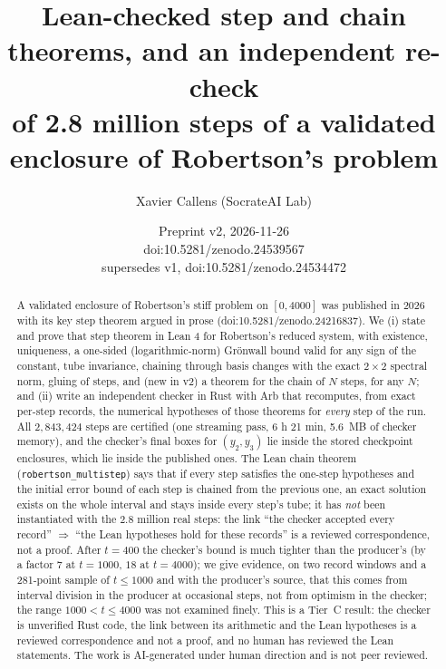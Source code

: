 \documentclass[11pt]{article}
\title{Lean-checked step and chain theorems, and an independent re-check\\
of 2.8 million steps of a validated enclosure of Robertson's problem}
\author{Xavier Callens (SocrateAI Lab)}
\date{Preprint v2, 2026-11-26 \\ doi:10.5281/zenodo.24539567 \\ supersedes v1, doi:10.5281/zenodo.24534472}
\begin{document}
\maketitle

\begin{abstract}
A validated enclosure of Robertson's stiff problem on $[0,4000]$ was published in 2026 with its key step theorem argued in prose
(doi:10.5281/zenodo.24216837). We (i) state and prove that step theorem in Lean 4 for Robertson's reduced system, with existence,
uniqueness, a one-sided (logarithmic-norm) Gr\"onwall bound valid for any sign of the constant, tube invariance, chaining through
basis changes with the exact $2\times2$ spectral norm, gluing of steps, and (new in v2) a theorem for the chain of $N$ steps, for any $N$; and (ii) write an independent checker in Rust with Arb
that recomputes, from exact per-step records, the numerical hypotheses of those theorems for \emph{every} step of the run. All
$2{,}843{,}424$ steps are certified (one streaming pass, 6 h 21 min, 5.6~MB of checker memory), and the checker's final boxes for $(y_2,y_3)$ lie inside the
stored checkpoint enclosures, which lie inside the published ones. The Lean chain theorem (\texttt{robertson\_multistep}) says that if every step satisfies the one-step hypotheses and the
initial error bound of each step is chained from the previous one, an exact solution exists on the whole interval and stays inside every step's tube; it has \emph{not} been instantiated with
the $2.8$ million real steps: the link ``the checker accepted every record'' $\Rightarrow$ ``the Lean hypotheses hold for these records'' is a reviewed correspondence, not a proof. After $t=400$ the checker's bound is much tighter than the producer's (by a factor $7$ at $t=1000$, $18$ at $t=4000$); we
give evidence, on two record windows and a 281-point sample of $t\le1000$ and with the producer's source, that this comes from interval division in the producer at
occasional steps, not from optimism in the checker; the range $1000<t\le4000$ was not examined finely. This is a Tier~C
result: the checker is unverified Rust code, the link between its arithmetic and the Lean hypotheses is a reviewed correspondence
and not a proof, and no human has reviewed the Lean statements. The work is AI-generated under human direction and is not peer reviewed.
\end{abstract}
\end{document}
